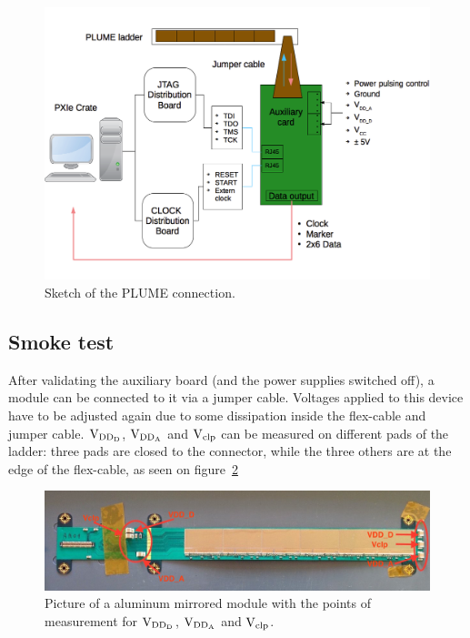   \begin{figure}[!h]
    \centering
    \includegraphics[width=\textwidth]{Pictures/labTests/plumeAux.png}
    \caption{Sketch of the PLUME connection.}
    \label{fig:plumeAux}
  \end{figure}

  \subsection{Smoke test}

  After validating the auxiliary board (and the power supplies switched off), a module can be connected to it via a jumper cable.
  Voltages applied to this device have to be adjusted again due to some dissipation inside the flex-cable and jumper cable.
  $\rm{V}_{\rm{DD_D}}$, $\rm{V}_{\rm{DD_A}}$ and $\rm{V}_{\rm{clp}}$ can be measured on different pads of the ladder: three pads are closed to the connector, while the three others are at the edge of the flex-cable, as seen on figure~\ref{fig:voltagePads}

  \begin{figure}[!h]
    \centering
    \includegraphics[width=\textwidth]{Pictures/labTests/AM01_voltagePads.jpg}
    \caption{Picture of a aluminum mirrored module with the points of measurement for $\rm{V}_{\rm{DD_D}}$, $\rm{V}_{\rm{DD_A}}$ and $\rm{V}_{\rm{clp}}$.}
    \label{fig:voltagePads}
  \end{figure}

